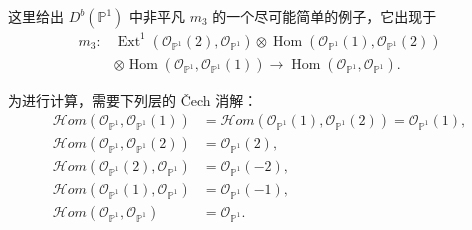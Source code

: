 \begin{example}\label{ex:8.8}
这里给出 $D^b(\mathbb P^1)$ 中非平凡 $m_3$ 的一个尽可能简单的例子，它出现于
\[
\begin{aligned}
m_3\colon{}&\operatorname{Ext}^1(\mathcal O_{\mathbb P^1}(2),\mathcal O_{\mathbb P^1})
\otimes\operatorname{Hom}(\mathcal O_{\mathbb P^1}(1),\mathcal O_{\mathbb P^1}(2))\\
&\otimes\operatorname{Hom}(\mathcal O_{\mathbb P^1},\mathcal O_{\mathbb P^1}(1))
\longrightarrow\operatorname{Hom}(\mathcal O_{\mathbb P^1},\mathcal O_{\mathbb P^1}).
\end{aligned}
\]

为进行计算，需要下列层的 Čech 消解：
\[
\begin{aligned}
\mathcal{H}om(\mathcal O_{\mathbb P^1},\mathcal O_{\mathbb P^1}(1))
&=\mathcal{H}om(\mathcal O_{\mathbb P^1}(1),\mathcal O_{\mathbb P^1}(2))
=\mathcal O_{\mathbb P^1}(1),\\
\mathcal{H}om(\mathcal O_{\mathbb P^1},\mathcal O_{\mathbb P^1}(2))
&=\mathcal O_{\mathbb P^1}(2),\\
\mathcal{H}om(\mathcal O_{\mathbb P^1}(2),\mathcal O_{\mathbb P^1})
&=\mathcal O_{\mathbb P^1}(-2),\\
\mathcal{H}om(\mathcal O_{\mathbb P^1}(1),\mathcal O_{\mathbb P^1})
&=\mathcal O_{\mathbb P^1}(-1),\\
\mathcal{H}om(\mathcal O_{\mathbb P^1},\mathcal O_{\mathbb P^1})
&=\mathcal O_{\mathbb P^1}.
\end{aligned}
\]


\end{example}
